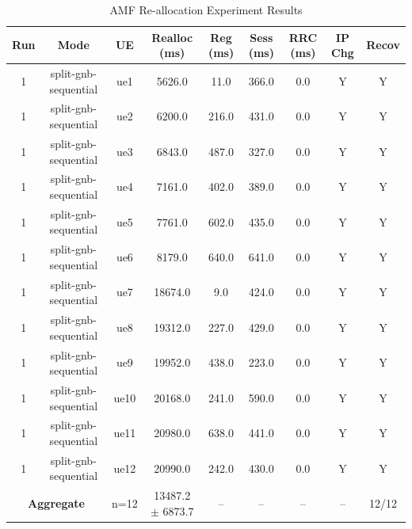\begin{table}[ht]
\centering
\begin{tabular}{|c|c|c|c|c|c|c|c|c|}
\hline
Run & Mode & UE & Realloc (ms) & Reg (ms) & Sess (ms) & RRC (ms) & IP Chg & Recov \\
\hline
1 & split-gnb-sequential & ue1 & 5626.0 & 11.0 & 366.0 & 0.0 & Y & Y \\
1 & split-gnb-sequential & ue2 & 6200.0 & 216.0 & 431.0 & 0.0 & Y & Y \\
1 & split-gnb-sequential & ue3 & 6843.0 & 487.0 & 327.0 & 0.0 & Y & Y \\
1 & split-gnb-sequential & ue4 & 7161.0 & 402.0 & 389.0 & 0.0 & Y & Y \\
1 & split-gnb-sequential & ue5 & 7761.0 & 602.0 & 435.0 & 0.0 & Y & Y \\
1 & split-gnb-sequential & ue6 & 8179.0 & 640.0 & 641.0 & 0.0 & Y & Y \\
1 & split-gnb-sequential & ue7 & 18674.0 & 9.0 & 424.0 & 0.0 & Y & Y \\
1 & split-gnb-sequential & ue8 & 19312.0 & 227.0 & 429.0 & 0.0 & Y & Y \\
1 & split-gnb-sequential & ue9 & 19952.0 & 438.0 & 223.0 & 0.0 & Y & Y \\
1 & split-gnb-sequential & ue10 & 20168.0 & 241.0 & 590.0 & 0.0 & Y & Y \\
1 & split-gnb-sequential & ue11 & 20980.0 & 638.0 & 441.0 & 0.0 & Y & Y \\
1 & split-gnb-sequential & ue12 & 20990.0 & 242.0 & 430.0 & 0.0 & Y & Y \\
\multicolumn{2}{|c|}{\textbf{Aggregate}} & n=12 & 13487.2 $\pm$ 6873.7 & -- & -- & -- & -- & 12/12 \\
\hline
\end{tabular}
\caption{AMF Re-allocation Experiment Results}
\label{tab:amf_realloc}
\end{table}

